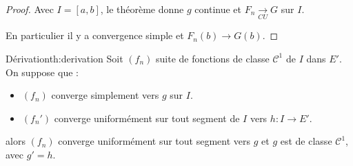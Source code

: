 
\begin{proof}
    \avspace Avec $I = [a, b]$, le théorème donne $g$ continue et $F_n \xrightarrow[CU]{} G$ sur $I$. 

    En particulier il y a convergence simple et $F_n(b) \to G(b)$.
\end{proof}

\begin{theoreme}{Dérivation}{th:derivation}
    Soit $(f_n)$ suite de fonctions de classe $\mathscr{C}^1$ de $I$ dans $E'$.
    On suppose que : 
    \begin{itemize}
        \item $(f_n)$ converge simplement vers $g$ sur $I$.
        \item $(f_n')$ converge uniformément sur tout segment de $I$ vers $h : I \to E'$.
    \end{itemize}

    alors $(f_n)$ converge uniformément sur tout segment vers $g$ et $g$ est de classe $\mathscr{C}^1$, 
    avec $g' = h$.
\end{theoreme}


